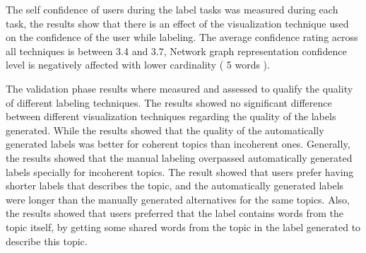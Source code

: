\newParagraph
The self confidence of users during the label tasks was measured during each task, the results show that there is an effect of the visualization technique used
on the confidence of the user while labeling. The average confidence rating across all techniques is between 3.4 and 3.7, Network graph representation confidence
level is negatively affected with lower cardinality ( 5 words ).

\newParagraph
The validation phase results where measured and assessed to qualify the quality of different labeling techniques. The results showed no significant difference between
different visualization techniques regarding the quality of the labels generated. While the results showed that the quality of the automatically generated labels was better for coherent topics than
incoherent ones. Generally, the results showed that the manual labeling overpassed automatically generated labels specially for incoherent topics.
The result showed that users prefer having shorter labels that describes the topic, and the automatically generated labels were longer than the manually generated alternatives
for the same topics. Also, the results showed that users preferred that the label contains words from the topic itself, by getting some shared words from the topic in the label
generated to describe this topic.
